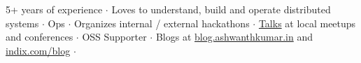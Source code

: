 

\begin{cvparagraph}
5+ years of experience ${\cdotp}$ Loves to understand, build and operate distributed systems ${\cdotp}$ Ops ${\cdotp}$ Organizes internal / external hackathons ${\cdotp}$ \href{https://github.com/ashwanthkumar/talks}{Talks} at local meetups and conferences ${\cdotp}$ OSS Supporter ${\cdotp}$ Blogs at \href{http://blog.ashwanthkumar.in/}{blog.ashwanthkumar.in} and \href{http://www.indix.com/blog/author/ashwanth/}{indix.com/blog} ${\cdotp}$
\end{cvparagraph}
